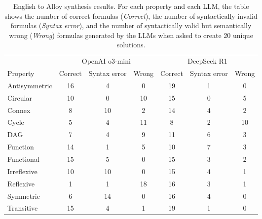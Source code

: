 \begin{table*}[!t]
\centering
\begin{tabular}{l|ccc|ccc}
\toprule
 & \multicolumn{3}{c|}{OpenAI o3-mini} & \multicolumn{3}{c}{DeepSeek R1} \\
Property & Correct & \hspace*{2ex}Syntax error\hspace*{2ex} & Wrong & Correct & \hspace*{2ex}Syntax error\hspace*{2ex} & Wrong \\ \hline
Antisymmetric & 16 & 4 & 0 & 19 & 1 & 0 \\
Circular      & 10 & 0 & 10 & 15 & 0 & 5 \\
Connex        & 8  & 10 & 2  & 14 & 4 & 2 \\
Cycle         & 5  & 4  & 11 & 8  & 2 & 10 \\
DAG           & 7  & 4  & 9  & 11 & 6 & 3 \\
Function      & 14 & 1  & 5  & 10 & 7 & 3 \\
Functional    & 15 & 5  & 0  & 15 & 3 & 2 \\
Irreflexive   & 10 & 10 & 0  & 15 & 4 & 1 \\
Reflexive     & 1  & 1  & 18 & 16 & 3 & 1 \\
Symmetric     & 6  & 14 & 0  & 16 & 4 & 0 \\
Transitive    & 15 & 4  & 1  & 19 & 1 & 0 \\
\bottomrule
\end{tabular}
\vspace*{2ex}
\caption{English to Alloy synthesis results.  For each property and
  each LLM, the table shows the number of correct formulas
  (\emph{Correct}), the number of syntactically invalid formulas
  (\emph{Syntax error}), and the number of syntactically valid but
  semantically wrong (\emph{Wrong}) formulas generated by the LLMs
  when asked to create 20 unique solutions.}
\label{tab:EnglishToAlloy-results}
\end{table*}

